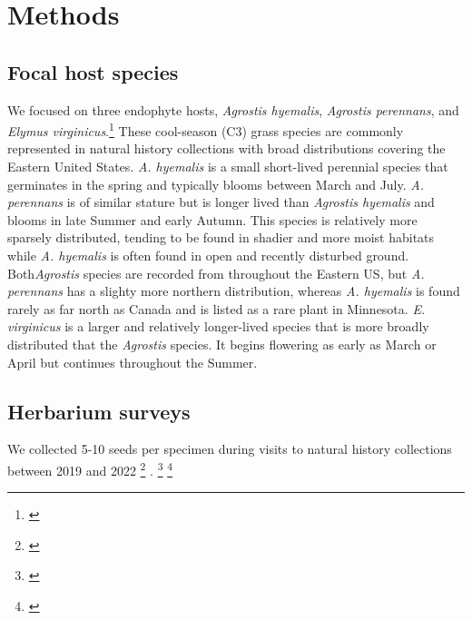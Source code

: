 \documentclass[11pt]{article}
\newcommand{\tom}[2]{{\color{red}{#1}}\footnote{\textit{\color{red}{#2}}}}
\begin{document}
\section*{Methods}
        \subsection*{Focal host species}
We focused on three endophyte hosts, \emph{Agrostis hyemalis}, \emph{Agrostis perennans}, and \emph{Elymus virginicus}.\tom{}{Describe the fungal species.}
These cool-season (C3) grass species are commonly represented in natural history collections with broad distributions covering the Eastern United States.
\emph{A. hyemalis} is a small short-lived perennial species that germinates in the spring and typically blooms between March and July.
\emph{A. perennans} is of similar stature but is longer lived than \emph{Agrostis hyemalis} and blooms in late Summer and early Autumn. 
This species is relatively more  sparsely distributed, tending to be found in shadier and more moist habitats while \emph{A. hyemalis} is often found in open and recently disturbed ground. 
Both\emph{Agrostis} species are recorded from throughout the Eastern US, but \emph{A. perennans} has a slighty more northern distribution, whereas \emph{A. hyemalis} is found rarely as far north as Canada and is listed as a rare plant in Minnesota.
\emph{E. virginicus} is a larger and relatively longer-lived  species that is more broadly distributed that the \emph{Agrostis} species. 
It begins flowering as early as March or April but continues throughout the Summer.

		\subsection*{Herbarium surveys}
We collected 5-10 seeds per specimen during visits to natural history collections between 2019 and 2022 \tom{(See Table A1 for a summary of collections)}{It is important to say more in the text here about where you went and what you did.} . 
\tom{Grasses are commonly identified and collected based on the presence of their reproductive structures which ensured that specimens we examined contained seeds.}{Move to intro} 
\tom{Our sampling plan was designed to minimize damage to these specimens.}{How so?}
\end{document}
